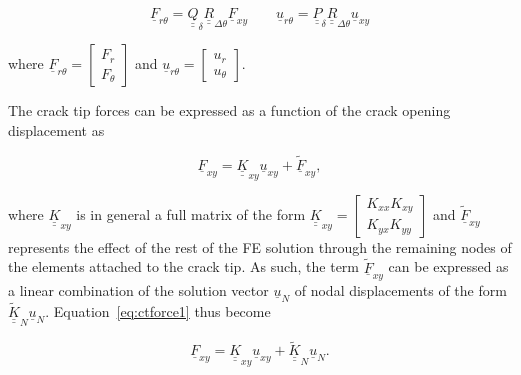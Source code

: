 \documentclass[review]{elsarticle}
\begin{document}
\begin{equation}\label{eq:FUrot}
\underline{F}_{r\theta}=\underline{\underline{Q}}_{\delta}\underline{\underline{R}}_{\Delta\theta}\underline{F}_{xy}\qquad\underline{u}_{r\theta}=\underline{\underline{P}}_{\delta}\underline{\underline{R}}_{\Delta\theta}\underline{u}_{xy}
\end{equation}

where $\underline{F}_{r\theta}=\begin{bmatrix}
F_{r} \\
F_{\theta}
\end{bmatrix}$ and $\underline{u}_{r\theta}=\begin{bmatrix}
u_{r} \\
u_{\theta}
\end{bmatrix}$.

The crack tip forces can be expressed as a function of the crack opening displacement as 

\begin{equation}\label{eq:ctforce1}
\underline{F}_{xy}=\underline{\underline{K}}_{xy}\underline{u}_{xy}+\underline{\widetilde{F}}_{xy},
\end{equation}
 
where $\underline{\underline{K}}_{xy}$ is in general a full matrix of the form $\underline{\underline{K}}_{xy}=\begin{bmatrix}
K_{xx}  K_{xy}\\
K_{yx}  K_{yy}
\end{bmatrix}$ and $\underline{\widetilde{F}}_{xy}$ represents the effect of the rest of the FE solution through the remaining nodes of the elements attached to the crack tip. As such, the term $\underline{\widetilde{F}}_{xy}$ can be expressed as a linear combination of the solution vector $\underline{u}_{N}$ of nodal displacements of the form $\underline{\underline{\widetilde{K}}}_{N}\underline{u}_{N}$. Equation~\ref{eq:ctforce1} thus become

\begin{equation}\label{eq:ctforce2}
\underline{F}_{xy}=\underline{\underline{K}}_{xy}\underline{u}_{xy}+\underline{\underline{\widetilde{K}}}_{N}\underline{u}_{N}.
\end{equation}
\end{document}
